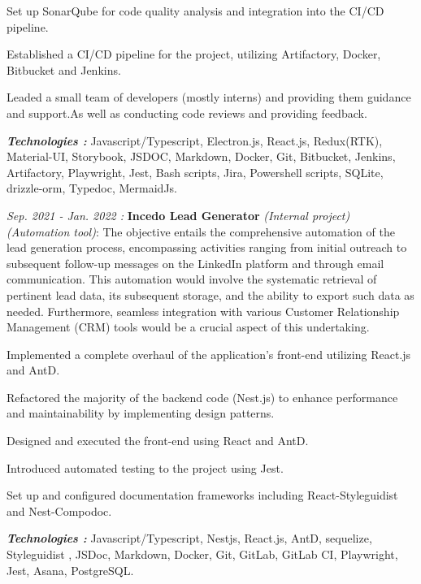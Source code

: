 \begin{cventries}
{\begin{cvitems}
{\begin{cvitems}
          \item {Set up SonarQube for code quality analysis and integration into the CI/CD pipeline.}
          \item {Established a CI/CD pipeline for the project, utilizing Artifactory, Docker, Bitbucket and Jenkins.}
          \item {Leaded a small team of developers (mostly interns) and providing them guidance and support.As well as conducting code reviews and providing feedback.}
        \end{cvitems}
        \vspace{5mm}
        \textbf{\textit{Technologies :}} Javascript/Typescript, Electron.js, React.js, Redux(RTK), Material-UI, Storybook, JSDOC, Markdown, Docker, Git, Bitbucket, Jenkins, Artifactory, Playwright, Jest, Bash scripts, Jira, Powershell scripts, SQLite, drizzle-orm, Typedoc, MermaidJs.
        \vspace{5mm}
        }
        \item {
          \textit{Sep. 2021 - Jan. 2022 : }\textbf{Incedo Lead Generator} \textit{(Internal project)} \textit{(Automation tool)}:
          \newline The objective entails the comprehensive automation of the lead generation process, encompassing activities ranging from initial outreach to subsequent follow-up messages on the LinkedIn platform and through email communication. This automation would involve the systematic retrieval of pertinent lead data, its subsequent storage, and the ability to export such data as needed. Furthermore, seamless integration with various Customer Relationship Management (CRM) tools would be a crucial aspect of this undertaking.
        \vspace{5mm}
      \begin{cvitems}
        \item {Implemented a complete overhaul of the application's front-end utilizing React.js and AntD.}
        \item {Refactored the majority of the backend code (Nest.js) to enhance performance and maintainability by implementing design patterns.}
        \item {Designed and executed the front-end using React and AntD.}
        \item {Introduced automated testing to the project using Jest.}
        \item {Set up and configured documentation frameworks including React-Styleguidist and Nest-Compodoc.}
      \end{cvitems}
      \vspace{5mm}
      \textbf{\textit{Technologies :}} Javascript/Typescript, Nestjs, React.js, AntD, sequelize, Styleguidist , JSDoc, Markdown, Docker, Git, GitLab, GitLab CI, Playwright, Jest, Asana, PostgreSQL.
      \vspace{5mm}}
       \end{cvitems}
    }


\end{cventries}
